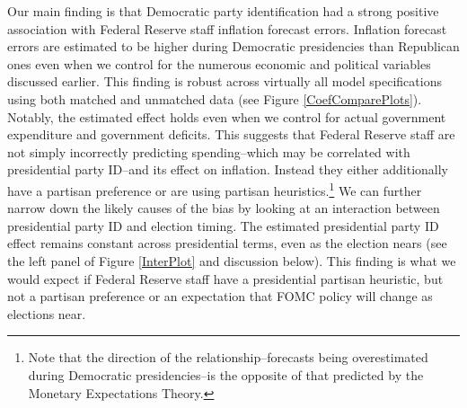 \documentclass[a4paper]{article}\usepackage{graphicx, color}
\begin{document}
Our main finding is that Democratic party identification had a strong positive association with Federal Reserve staff inflation forecast errors. Inflation forecast errors are estimated to be higher during Democratic presidencies than Republican ones even when we control for the numerous economic and political variables discussed earlier. This finding is robust across virtually all model specifications using both matched and unmatched data (see Figure \ref{CoefComparePlots}). Notably, the estimated effect holds even when we control for actual government expenditure and government deficits. This suggests that Federal Reserve staff are not simply incorrectly predicting spending--which may be correlated with presidential party ID--and its effect on inflation. Instead they either additionally have a partisan preference or are using partisan heuristics.\footnote{Note that the direction of the relationship--forecasts being overestimated during Democratic presidencies--is the opposite of that predicted by the Monetary Expectations Theory.} We can further narrow down the likely causes of the bias by looking at an interaction between presidential party ID and election timing. The estimated presidential party ID effect remains constant across presidential terms, even as the election nears (see the left panel of Figure \ref{InterPlot} and discussion below). This finding is what we would expect if Federal Reserve staff have a presidential partisan heuristic, but not a partisan preference or an expectation that FOMC policy will change as elections near.
\end{document}
